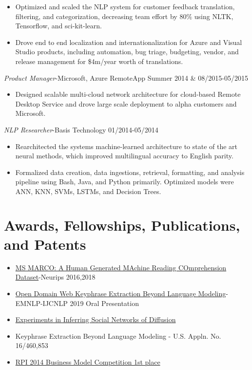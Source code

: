 \documentclass[line,margin]{res}
\begin{document}
\begin{resume}
\begin{itemize}
\item Optimized and scaled the NLP system for customer feedback translation, filtering, and categorization, decreasing team effort by $80\%$ using NLTK, Tensorflow, and sci-kit-learn.
\item Drove end to end localization and internationalization for Azure and Visual Studio products, including automation, bug triage, budgeting, vendor, and release management for \$4m/year worth of translations.
\end{itemize}
{\sl Product Manager}-Microsoft, Azure RemoteApp  \hfill Summer 2014 \& 08/2015-05/2015
\begin{itemize}  \itemsep -4pt
\item Designed scalable multi-cloud network architecture for cloud-based Remote Desktop Service and drove large scale deployment to alpha customers and Microsoft.
\end{itemize}
{\sl NLP Researcher}-Basis Technology \hfill 01/2014-05/2014
\begin{itemize}  \itemsep -4pt
\item Rearchitected the systems machine-learned architecture to state of the art neural methods, which improved multilingual accuracy to English parity.
\item Formalized data creation, data ingestions, retrieval, formatting, and analysis pipeline using Bash, Java, and Python primarily. Optimized models were ANN, KNN, SVMs, LSTMs, and Decision Trees.
\end{itemize}
\section{Awards, Fellowships, Publications, and Patents}
\begin{itemize}
\itemsep -5pt
\item \href{https://arxiv.org/pdf/1611.09268.pdf}{MS MARCO: A Human Generated MAchine Reading COmprehension Dataset}-Neurips 2016,2018
\item \href{https://www.emnlp-ijcnlp2019.org/program/accepted/f}{Open Domain Web Keyphrase Extraction Beyond Language Modeling}-EMNLP-IJCNLP 2019 Oral Presentation
\item \href{https://arxiv.org/pdf/}{Experiments in Inferring Social Networks of Diffusion}
\item Keyphrase Extraction Beyond Language Modeling - U.S. Appln. No. 16/460,853
\item \href{https://everydaymatters.rpi.edu/business-model-competition/#.XhOXH0f0lyw}{RPI 2014 Business Model Competition 1st place}
\end{itemize}
\end{resume}
\end{document}
